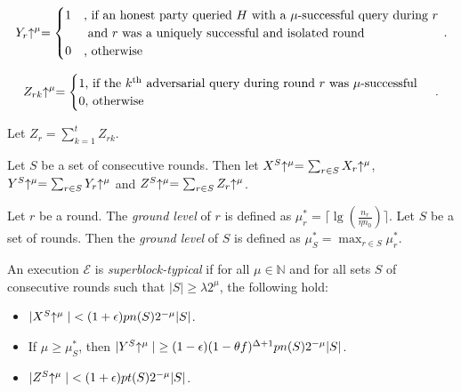 \begin{align*}
Y_r\negthickspace\uparrow^\mu = \begin{cases}
  1&\text{, if an honest party queried $H$ with a $\mu$-successful query during $r$}
   \\
   &\text{  and $r$ was a uniquely successful and isolated round}
    \\
  0&\text{, otherwise}
\end{cases}\,.
\end{align*}

\begin{align*}
Z_{r k}\negthickspace\uparrow^\mu = \begin{cases}
  1\text{, if the } k^\text{th} \text{ adversarial query during round $r$
           was $\mu$-successful}\\
  0\text{, otherwise}
\end{cases}\,.
\end{align*}

Let $Z_r = \sum_{k = 1}^t Z_{r k}$.

Let $S$ be a set of consecutive rounds. Then let
$X^S\negthickspace\uparrow^\mu = \sum_{r \in S}X_r\negthickspace\uparrow^\mu$,
$Y^S\negthickspace\uparrow^\mu = \sum_{r \in S}Y_r\negthickspace\uparrow^\mu$ and
$Z^S\negthickspace\uparrow^\mu = \sum_{r \in S}Z_r\negthickspace\uparrow^\mu$.

\begin{definition}
  Let $r$ be a round. The \emph{ground level} of $r$ is defined as
  $\mu^*_r = \lceil\lg(\frac{n_r}{\eta n_0})\rceil$. Let $S$ be a set of rounds.
  Then the \emph{ground level} of $S$ is defined as
  $\mu^*_S = \max_{r \in S}\mu^*_r$.
\end{definition}

\begin{definition}
  An execution $\mathcal{E}$ is \emph{superblock-typical} if
  for all $\mu \in \mathbb{N}$ and
  for all sets $S$ of consecutive rounds such that $|S| \geq \lambda 2^\mu$,
  the following hold:

  \begin{itemize}
    \item $|X^S\negthickspace\uparrow^\mu| < (1 + \epsilon) p n(S) 2^{-\mu} |S| $.
    \item If $\mu \geq \mu^*_S$, then $|Y^S\negthickspace\uparrow^\mu| \geq (1 - \epsilon)  (1-\theta f)^{\Delta+1} p n(S) 2^{-\mu} |S|$.
    \item $|Z^S\negthickspace\uparrow^\mu| < (1 + \epsilon)  p t(S) 2^{-\mu}  |S|$.
  \end{itemize}
\end{definition}

